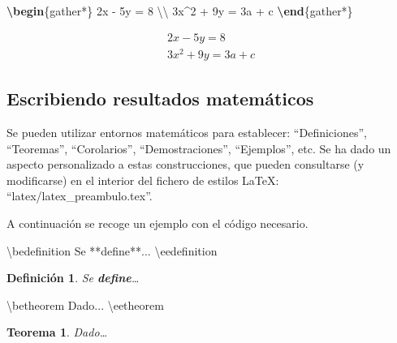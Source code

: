 \documentclass[12pt,a4paper,]{book}
\newenvironment{Shaded}{\begin{snugshade}}{\end{snugshade}}
\newcommand{\ExtensionTok}[1]{#1}
\newcommand{\KeywordTok}[1]{\textcolor[rgb]{0.13,0.29,0.53}{\textbf{#1}}}
\newcommand{\NormalTok}[1]{#1}
\newcommand{\SpecialCharTok}[1]{\textcolor[rgb]{0.00,0.00,0.00}{#1}}
\newcommand{\SpecialStringTok}[1]{\textcolor[rgb]{0.31,0.60,0.02}{#1}}
\newcounter{dummy}
\numberwithin{dummy}{section}
\theoremstyle{ocrenumbox}
\newtheorem{theoremeT}[dummy]{Teorema}  %
\theoremstyle{blacknumex}
\theoremstyle{blacknumbox}
\newtheorem{definitionT}{Definición}[section]  %
\theoremstyle{ocrenum}
\newenvironment{theorem}{\begin{tBox}\begin{theoremeT}}{\end{theoremeT}\end{tBox}}
\newenvironment{definition}{\begin{dBox}\begin{definitionT}}{\end{definitionT}\end{dBox}}
\theoremstyle{ocrenum}
\newcommand{\betheorem}{\begin{theorem}}
\newcommand{\eetheorem}{\end{theorem}}
\newcommand{\bedefinition}{\begin{definition}}
\newcommand{\eedefinition}{\end{definition}}
\begin{document}
\begin{Shaded}
\begin{Highlighting}[]
\KeywordTok{\textbackslash{}begin}\NormalTok{\{}\ExtensionTok{gather*}\NormalTok{\}}\SpecialStringTok{ }
\SpecialStringTok{2x {-} 5y =  8 }\SpecialCharTok{\textbackslash{}\textbackslash{}}\SpecialStringTok{ }
\SpecialStringTok{3x\^{}2 + 9y =  3a + c}
\KeywordTok{\textbackslash{}end}\NormalTok{\{}\ExtensionTok{gather*}\NormalTok{\}}
\end{Highlighting}
\end{Shaded}

\begin{gather*} 
2x - 5y =  8 \\ 
3x^2 + 9y =  3a + c
\end{gather*}

\hypertarget{escribiendo-resultados-matemuxe1ticos}{%
\subsection{Escribiendo resultados
matemáticos}\label{escribiendo-resultados-matemuxe1ticos}}

Se pueden utilizar entornos matemáticos para establecer:
``Definiciones'', ``Teoremas'', ``Corolarios'', ``Demostraciones'',
``Ejemplos'', etc. Se ha dado un aspecto personalizado a estas
construcciones, que pueden consultarse (y modificarse) en el interior
del fichero de estilos LaTeX: ``latex/latex\_preambulo.tex''.

A continuación se recoge un ejemplo con el código necesario.

\begin{Shaded}
\begin{Highlighting}[]
\NormalTok{\textbackslash{}bedefinition}
\NormalTok{Se **define**... }
\NormalTok{\textbackslash{}eedefinition}
\end{Highlighting}
\end{Shaded}

\bedefinition

Se \textbf{define}\ldots{} \eedefinition

\begin{Shaded}
\begin{Highlighting}[]
\NormalTok{\textbackslash{}betheorem}
\NormalTok{Dado...}
\NormalTok{\textbackslash{}eetheorem}
\end{Highlighting}
\end{Shaded}

\betheorem

Dado\ldots{} \eetheorem
\end{document}
